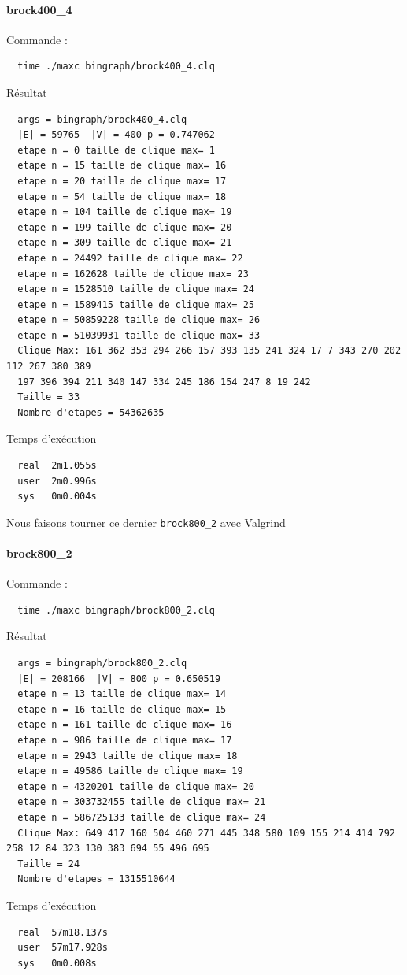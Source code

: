 \documentclass{article}
\begin{document}
\paragraph{brock400\_4}
Commande :
\begin{verbatim}
  time ./maxc bingraph/brock400_4.clq
\end{verbatim}
Résultat
\begin{verbatim}
  args = bingraph/brock400_4.clq
  |E| = 59765  |V| = 400 p = 0.747062
  etape n = 0 taille de clique max= 1
  etape n = 15 taille de clique max= 16
  etape n = 20 taille de clique max= 17
  etape n = 54 taille de clique max= 18
  etape n = 104 taille de clique max= 19
  etape n = 199 taille de clique max= 20
  etape n = 309 taille de clique max= 21
  etape n = 24492 taille de clique max= 22
  etape n = 162628 taille de clique max= 23
  etape n = 1528510 taille de clique max= 24
  etape n = 1589415 taille de clique max= 25
  etape n = 50859228 taille de clique max= 26
  etape n = 51039931 taille de clique max= 33
  Clique Max: 161 362 353 294 266 157 393 135 241 324 17 7 343 270 202 112 267 380 389
  197 396 394 211 340 147 334 245 186 154 247 8 19 242
  Taille = 33
  Nombre d'etapes = 54362635
\end{verbatim}
Temps d'exécution
\begin{verbatim}
  real  2m1.055s
  user  2m0.996s
  sys   0m0.004s
\end{verbatim}
Nous faisons tourner ce dernier \texttt{brock800\_2} avec Valgrind
\paragraph{brock800\_2}
Commande :
\begin{verbatim}
  time ./maxc bingraph/brock800_2.clq
\end{verbatim}
Résultat
\begin{verbatim}
  args = bingraph/brock800_2.clq
  |E| = 208166  |V| = 800 p = 0.650519
  etape n = 13 taille de clique max= 14
  etape n = 16 taille de clique max= 15
  etape n = 161 taille de clique max= 16
  etape n = 986 taille de clique max= 17
  etape n = 2943 taille de clique max= 18
  etape n = 49586 taille de clique max= 19
  etape n = 4320201 taille de clique max= 20
  etape n = 303732455 taille de clique max= 21
  etape n = 586725133 taille de clique max= 24
  Clique Max: 649 417 160 504 460 271 445 348 580 109 155 214 414 792 258 12 84 323 130 383 694 55 496 695
  Taille = 24
  Nombre d'etapes = 1315510644
\end{verbatim}
Temps d'exécution
\begin{verbatim}
  real  57m18.137s
  user  57m17.928s
  sys   0m0.008s
\end{verbatim}
\end{document}
